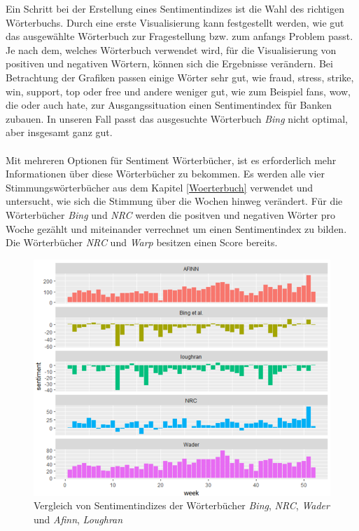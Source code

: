 Ein Schritt bei der Erstellung eines Sentimentindizes ist die Wahl des richtigen Wörterbuchs. Durch eine erste Visualisierung kann festgestellt werden, wie gut das ausgewählte Wörterbuch zur Fragestellung bzw. zum anfangs Problem passt. Je nach dem, welches Wörterbuch verwendet wird, für die Visualisierung von positiven und negativen Wörtern, können sich die Ergebnisse verändern. Bei Betrachtung der Grafiken passen einige Wörter sehr gut, wie fraud, stress, strike, win, support, top oder free und andere weniger gut, wie zum Beispiel fans, wow, die oder auch hate, zur Ausgangssituation einen Sentimentindex für Banken zubauen. In unseren Fall passt das ausgesuchte Wörterbuch \textit{Bing} nicht optimal, aber insgesamt ganz gut.
\\
\\
Mit mehreren Optionen für Sentiment Wörterbücher, ist es erforderlich mehr Informationen über diese Wörterbücher zu bekommen. Es werden alle vier Stimmungswörterbücher aus dem Kapitel \ref{Woerterbuch} verwendet und untersucht, wie sich die Stimmung über die Wochen hinweg verändert. Für die Wörterbücher \textit{Bing} und \textit{NRC} werden die positven und negativen Wörter pro Woche gezählt und miteinander verrechnet um einen Sentimentindex zu bilden. Die Wörterbücher \textit{NRC} und \textit{Warp} besitzen einen Score bereits.
\begin{figure}[H]
	\centering
	\includegraphics[width=1\textwidth]{Pictures/Woertbuch.png}
	\caption{Vergleich von Sentimentindizes der Wörterbücher \textit{Bing}, \textit{NRC}, \textit{Wader} und \textit{Afinn}, \textit{Loughran}}
	\label{senti}
\end{figure}
